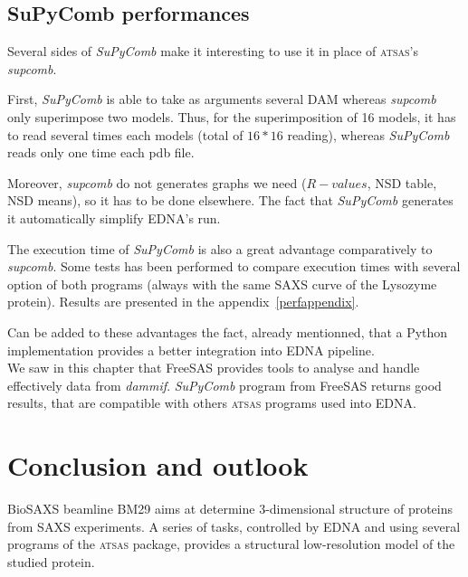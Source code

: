 \documentclass[a4paper, 11pt]{report}
\begin{document}
\section{SuPyComb performances}%

Several sides of \textit{SuPyComb} make it interesting to use it in 
place of \textsc{atsas}'s \textit{supcomb}.

First, \textit{SuPyComb} is able to take as arguments several DAM 
whereas \textit{supcomb} only superimpose two models. 
Thus, for the superimposition of 16 models, it has to read several 
times each models (total of $16*16$ reading), whereas 
\textit{SuPyComb} reads only one time each pdb file.

Moreover, \textit{supcomb} do not generates graphs we need 
($R-values$, NSD table, NSD means), so it has to be done elsewhere. 
The fact that \textit{SuPyComb} generates it automatically simplify 
EDNA's run.

The execution time of \textit{SuPyComb} is also a great advantage 
comparatively to \textit{supcomb}. 
Some tests has been performed to compare execution times with several 
option of both programs (always with the same SAXS curve of the 
Lysozyme protein). 
Results are presented in the appendix~\ref{perfappendix}.%

Can be added to these advantages the fact, already mentionned, that a 
Python implementation provides a better integration into EDNA 
pipeline.\\

We saw in this chapter that FreeSAS provides tools to analyse and 
handle effectively data from \textit{dammif}. 
\textit{SuPyComb} program from FreeSAS returns good results, that are 
compatible with others \textsc{atsas} programs used into EDNA.


\chapter*{Conclusion and outlook}

BioSAXS beamline BM29 aims at determine 3-dimensional structure of 
proteins from SAXS experiments. 
A series of tasks, controlled by EDNA and using several programs of 
the \textsc{atsas} package, provides a structural low-resolution model 
of the studied protein.\\
\end{document}
